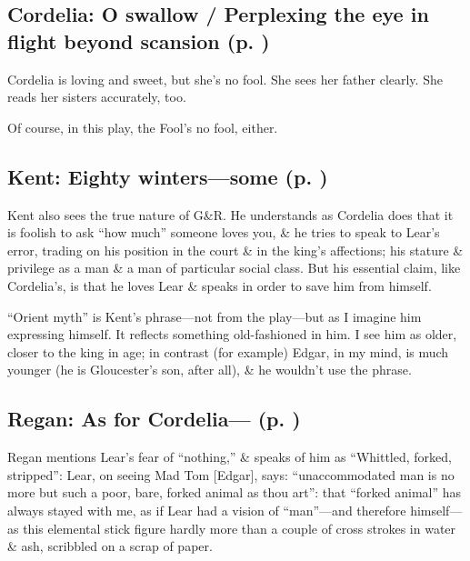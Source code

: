 \subsection{Cordelia: O swallow / Perplexing the eye in flight beyond scansion (p. \pageref{ch:lear_af})}
Cordelia is loving and sweet, but she's no fool. She sees her father clearly. She reads her sisters accurately, too.

Of course, in this play, the Fool's no fool, either.

\subsection{Kent: Eighty winters---some (p. \pageref{ch:lear_ag})}
Kent also sees the true nature of G\&R. He understands as Cordelia does that it is foolish to ask ``how much'' someone loves you, \& he tries to speak to Lear's error, trading on his position in the court \& in the king's affections; his stature \& privilege as a man \& a man of particular social class. But his essential claim, like Cordelia's, is that he loves Lear \& speaks in order to save him from himself.

``Orient myth'' is Kent's phrase---not from the play---but as I imagine him expressing himself. It reflects something old-fashioned in him. I see him as older, closer to the king in age; in contrast (for example) Edgar, in my mind, is much younger (he is Gloucester's son, after all), \& he wouldn't use the phrase.

\subsection{Regan: As for Cordelia--- (p. \pageref{ch:lear_ah})}
Regan mentions Lear's fear of ``nothing,'' \& speaks of him as ``Whittled, forked, stripped'': Lear, on seeing Mad Tom {[}Edgar{]}, says: ``unaccommodated man is no more but such a poor, bare, forked animal as thou art'': that ``forked animal'' has always stayed with me, as if Lear had a vision of ``man''---and therefore himself---as this elemental stick figure hardly more than a couple of cross strokes in water \& ash, scribbled on a scrap of paper.


